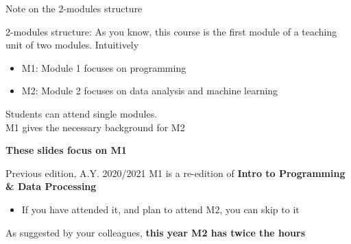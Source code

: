 \documentclass{beamer}%
\begin{document}
\begin{frame}{Note on the 2-modules structure}
	\begin{block}{2-modules structure: \myurl{\homepage}}
		As you know, this course is the first module of a teaching unit of two modules. Intuitively
		\begin{itemize}
			\item M1: Module 1 focuses on programming
			\item M2: Module 2 focuses  on data analysis and machine learning
		\end{itemize}
		Students can attend single modules. \\ M1 gives the necessary background for M2
		\begin{center}\textbf{These slides focus on M1}\end{center}
	\end{block}	
	\begin{block}{Previous edition, A.Y. 2020/2021}
		M1 is a re-edition of \textbf{Intro to Programming \& Data Processing}
		\begin{itemize}
			\item If you have attended it, and plan to attend M2, you can skip to it
		\end{itemize}
		As suggested by your colleagues, \textbf{this year M2 has twice the hours}
	\end{block}
\end{frame}
\end{document}
